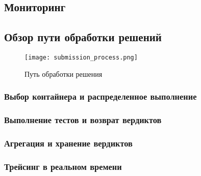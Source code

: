 

\subsection{Мониторинг}



\subsection{Обзор пути обработки решений}
\begin{figure}[h]
    \centering
    \texttt{[image: submission\_process.png]}
    \caption{Путь обработки решения}
\end{figure}

\subsubsection{Выбор контайнера и распределенное выполнение}

\subsubsection{Выполнение тестов и возврат вердиктов}

\subsubsection{Агрегация и хранение вердиктов}

\subsubsection{Трейсинг в реальном времени}

